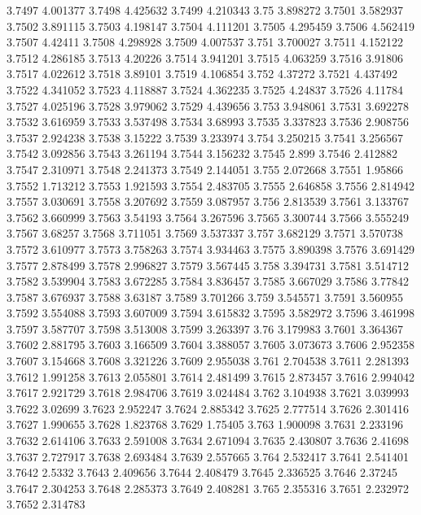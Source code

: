 3.7497  4.001377
3.7498  4.425632
3.7499  4.210343
3.75  3.898272
3.7501  3.582937
3.7502  3.891115
3.7503  4.198147
3.7504  4.111201
3.7505  4.295459
3.7506  4.562419
3.7507  4.42411
3.7508  4.298928
3.7509  4.007537
3.751  3.700027
3.7511  4.152122
3.7512  4.286185
3.7513  4.20226
3.7514  3.941201
3.7515  4.063259
3.7516  3.91806
3.7517  4.022612
3.7518  3.89101
3.7519  4.106854
3.752  4.37272
3.7521  4.437492
3.7522  4.341052
3.7523  4.118887
3.7524  4.362235
3.7525  4.24837
3.7526  4.11784
3.7527  4.025196
3.7528  3.979062
3.7529  4.439656
3.753  3.948061
3.7531  3.692278
3.7532  3.616959
3.7533  3.537498
3.7534  3.68993
3.7535  3.337823
3.7536  2.908756
3.7537  2.924238
3.7538  3.15222
3.7539  3.233974
3.754  3.250215
3.7541  3.256567
3.7542  3.092856
3.7543  3.261194
3.7544  3.156232
3.7545  2.899
3.7546  2.412882
3.7547  2.310971
3.7548  2.241373
3.7549  2.144051
3.755  2.072668
3.7551  1.95866
3.7552  1.713212
3.7553  1.921593
3.7554  2.483705
3.7555  2.646858
3.7556  2.814942
3.7557  3.030691
3.7558  3.207692
3.7559  3.087957
3.756  2.813539
3.7561  3.133767
3.7562  3.660999
3.7563  3.54193
3.7564  3.267596
3.7565  3.300744
3.7566  3.555249
3.7567  3.68257
3.7568  3.711051
3.7569  3.537337
3.757  3.682129
3.7571  3.570738
3.7572  3.610977
3.7573  3.758263
3.7574  3.934463
3.7575  3.890398
3.7576  3.691429
3.7577  2.878499
3.7578  2.996827
3.7579  3.567445
3.758  3.394731
3.7581  3.514712
3.7582  3.539904
3.7583  3.672285
3.7584  3.836457
3.7585  3.667029
3.7586  3.77842
3.7587  3.676937
3.7588  3.63187
3.7589  3.701266
3.759  3.545571
3.7591  3.560955
3.7592  3.554088
3.7593  3.607009
3.7594  3.615832
3.7595  3.582972
3.7596  3.461998
3.7597  3.587707
3.7598  3.513008
3.7599  3.263397
3.76  3.179983
3.7601  3.364367
3.7602  2.881795
3.7603  3.166509
3.7604  3.388057
3.7605  3.073673
3.7606  2.952358
3.7607  3.154668
3.7608  3.321226
3.7609  2.955038
3.761  2.704538
3.7611  2.281393
3.7612  1.991258
3.7613  2.055801
3.7614  2.481499
3.7615  2.873457
3.7616  2.994042
3.7617  2.921729
3.7618  2.984706
3.7619  3.024484
3.762  3.104938
3.7621  3.039993
3.7622  3.02699
3.7623  2.952247
3.7624  2.885342
3.7625  2.777514
3.7626  2.301416
3.7627  1.990655
3.7628  1.823768
3.7629  1.75405
3.763  1.900098
3.7631  2.233196
3.7632  2.614106
3.7633  2.591008
3.7634  2.671094
3.7635  2.430807
3.7636  2.41698
3.7637  2.727917
3.7638  2.693484
3.7639  2.557665
3.764  2.532417
3.7641  2.541401
3.7642  2.5332
3.7643  2.409656
3.7644  2.408479
3.7645  2.336525
3.7646  2.37245
3.7647  2.304253
3.7648  2.285373
3.7649  2.408281
3.765  2.355316
3.7651  2.232972
3.7652  2.314783
